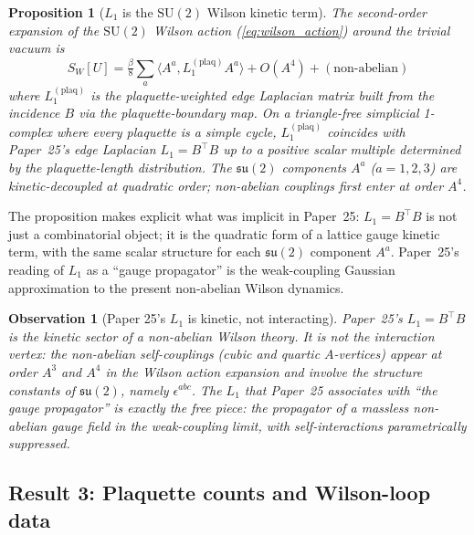 \documentclass[11pt]{article}
\newtheorem{proposition}{Proposition}
\newtheorem{observation}{Observation}
\begin{document}
\begin{proposition}[$L_1$ is the $\mathrm{SU}(2)$ Wilson kinetic term]
\label{prop:L1_kinetic}
The second-order expansion of the $\mathrm{SU}(2)$ Wilson action
(\ref{eq:wilson_action}) around the trivial vacuum is
\begin{equation}
S_W[U] = \tfrac{\beta}{8} \sum_a \langle A^{a}, L_1^{(\text{plaq})} A^{a}\rangle
+ O(A^4) + (\text{non-abelian})
\label{eq:L1_kinetic_form}
\end{equation}
where $L_1^{(\text{plaq})}$ is the plaquette-weighted edge Laplacian
matrix built from the incidence $B$ via the plaquette-boundary map.
On a triangle-free simplicial 1-complex where every plaquette is a
simple cycle, $L_1^{(\text{plaq})}$ coincides with Paper~25's edge
Laplacian $L_1 = B^{\top} B$ up to a positive scalar multiple
determined by the plaquette-length distribution.  The $\mathfrak{su}(2)$
components $A^{a}$ ($a = 1, 2, 3$) are kinetic-decoupled at
quadratic order; non-abelian couplings first enter at order $A^4$.
\end{proposition}

The proposition makes explicit what was implicit in Paper~25:
$L_1 = B^{\top} B$ is not just a combinatorial object; it is the
quadratic form of a lattice gauge kinetic term, with the same scalar
structure for each $\mathfrak{su}(2)$ component $A^a$.  Paper~25's
reading of $L_1$ as a ``gauge propagator'' is the weak-coupling
Gaussian approximation to the present non-abelian Wilson dynamics.

\begin{observation}[Paper 25's $L_1$ is kinetic, not interacting]
\label{obs:L1_structural}
Paper~25's $L_1 = B^{\top} B$ is the \emph{kinetic} sector of a
non-abelian Wilson theory.  It is not the interaction vertex: the
non-abelian self-couplings (cubic and quartic $A$-vertices) appear at
order $A^3$ and $A^4$ in the Wilson action expansion and involve the
structure constants of $\mathfrak{su}(2)$, namely $\epsilon^{abc}$.
The $L_1$ that Paper~25 associates with ``the gauge propagator'' is
exactly the free piece: the propagator of a massless non-abelian
gauge field in the weak-coupling limit, with self-interactions
parametrically suppressed.
\end{observation}

\subsection{Result 3: Plaquette counts and Wilson-loop data}
\label{sec:results_MC}
\end{document}
